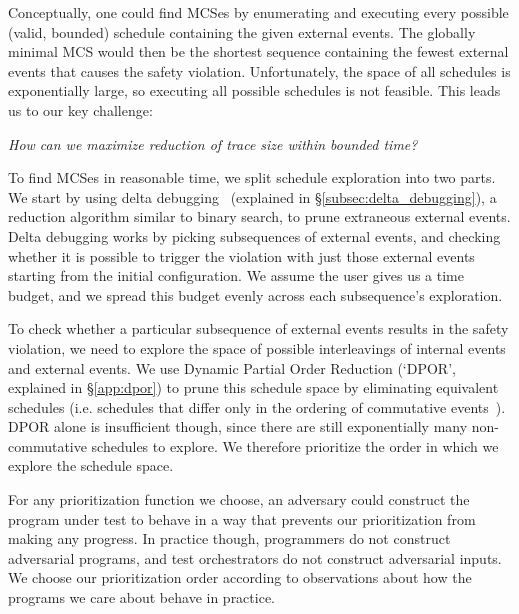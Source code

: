 
Conceptually, one could find MCSes by enumerating and executing every possible
(valid, bounded) schedule containing the given external events. The globally minimal MCS would
then be the shortest sequence containing
the fewest external events that causes the safety violation. Unfortunately, the space of all
schedules is exponentially large, so executing all possible schedules is not feasible.
This leads us to our key challenge:

\begin{displayquote}
{\em How can we maximize reduction of trace size within bounded time?}
\end{displayquote}


To find MCSes in reasonable time, we split schedule exploration into two
parts. We start by using delta debugging~\cite{Zeller:2002:SIF:506201.506206}
(explained in \S\ref{subsec:delta_debugging}), a reduction
algorithm similar to binary search, to prune extraneous external events. Delta debugging works by picking subsequences of external events, and checking whether
it is possible to trigger the violation with just those external
events starting from the initial configuration. We assume the user gives us a time budget, and we spread this budget evenly across each subsequence's exploration.

To check whether a particular subsequence of external events results in the safety violation,
we need to explore the space of possible interleavings of internal events and external events.
We use Dynamic Partial Order Reduction (`DPOR', explained in \S\ref{app:dpor}) to prune this schedule space by eliminating equivalent schedules (i.e. schedules
that differ only in the ordering of commutative
events~\cite{flanagan2005dynamic}). DPOR alone is insufficient though, since
there are still exponentially many non-commutative schedules to explore.
We therefore prioritize the order in which we explore the schedule space.

For any prioritization function we choose, an adversary could construct
the program under test to behave in a way that prevents our prioritization
from making any progress. In practice though,
programmers do not construct adversarial programs, and test orchestrators do not construct adversarial inputs. We choose our
prioritization order according to observations about how the programs we
care about behave in practice.

